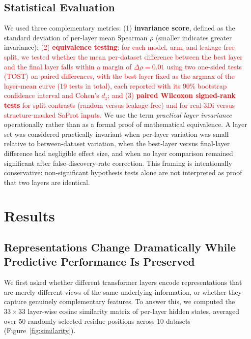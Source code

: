 \documentclass[numbered,webpdf,modern,large]{oup-authoring-template}
\newcommand{\rev}[1]{\textcolor{red}{#1}}
\begin{document}
\subsection{Statistical Evaluation}

We used three complementary metrics: (1) \textbf{invariance score}, defined as
the standard deviation of per-layer mean Spearman $\rho$ (smaller indicates greater invariance);
\rev{(2) \textbf{equivalence testing}: for each model, arm, and leakage-free split,
we tested whether the mean per-dataset difference between the best layer and the final
layer falls within a margin of $\Delta\rho = 0.01$ using two one-sided tests (TOST) on
paired differences, with the best layer fixed as the argmax of the layer-mean curve
(19 tests in total), each reported with its 90\% bootstrap confidence interval and
Cohen's $d_z$; and (3) \textbf{paired Wilcoxon signed-rank tests} for split contrasts
(random versus leakage-free) and for real-3Di versus structure-masked SaProt inputs.}
We use the term \emph{practical layer invariance} operationally rather than as a
formal proof of mathematical equivalence. A layer set was considered practically
invariant when per-layer variation was small relative to between-dataset variation,
when the best-layer versus final-layer difference had negligible effect size, and
when no layer comparison remained significant after false-discovery-rate correction.
This framing is intentionally conservative: non-significant hypothesis tests alone
are not interpreted as proof that two layers are identical.

\section{Results}

\subsection{Representations Change Dramatically While Predictive Performance Is Preserved}

We first asked whether different transformer layers encode representations that are
merely different views of the same underlying information, or whether they capture
genuinely complementary features. To answer this, we computed the $33 \times 33$ layer-wise
cosine similarity matrix of per-layer hidden states, averaged over 50 randomly selected
residue positions across 10 datasets (Figure~\ref{fig:similarity}).
\end{document}
